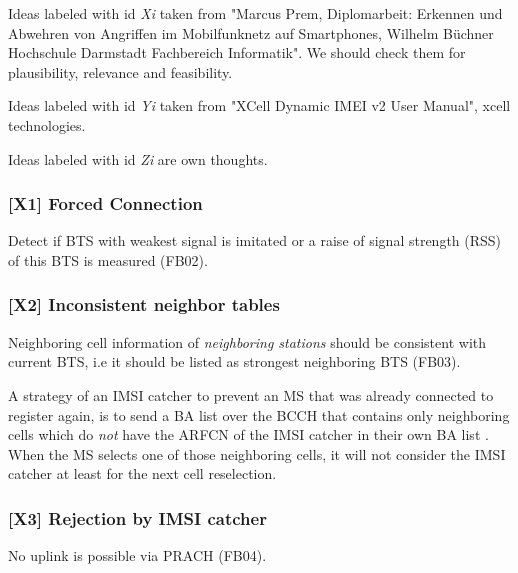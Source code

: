 \documentclass[a4paper,11pt,notitlepage,bigheadings,oneside]{scrartcl}
\begin{document}
Ideas labeled with id \emph{Xi} taken from "Marcus Prem, Diplomarbeit: Erkennen
und Abwehren von Angriffen im Mobilfunknetz auf Smartphones, Wilhelm Büchner
Hochschule Darmstadt Fachbereich Informatik". We should check them for
plausibility, relevance and feasibility.

Ideas labeled with id \emph{Yi} taken from "XCell Dynamic IMEI v2 User Manual",
xcell technologies.

Ideas labeled with id \emph{Zi} are own thoughts.

\subsubsection{[X1] Forced Connection}

Detect if BTS with weakest signal is imitated or a  raise of signal strength
(RSS) of this BTS is measured (FB02).

\subsubsection{[X2] Inconsistent neighbor tables}

Neighboring cell information of \emph{neighboring stations} should be
consistent with current BTS, i.e it should be listed as strongest neighboring
BTS (FB03).

A strategy of an IMSI catcher to prevent an MS that was already connected to
register again, is to send a BA list over the BCCH that contains only
neighboring cells which do \emph{not} have the ARFCN of the IMSI catcher in
their own BA list \cite[0027]{bott2000verfahren}. When the MS selects one of
those neighboring cells, it will not consider the IMSI catcher at least for the
next cell reselection.


\subsubsection{[X3] Rejection by IMSI catcher}

No uplink is possible via PRACH (FB04). 
\end{document}

